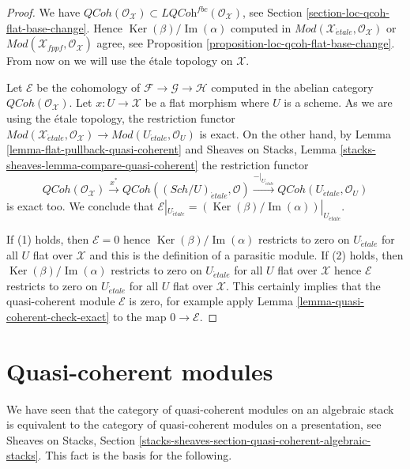 \documentclass{stacks-project}
\theoremstyle{plain}
\theoremstyle{definition}
\theoremstyle{remark}
\numberwithin{equation}{subsection}
\def\Sch{\mathit{Sch}}
\def\etale{{\acute{e}tale}}
\def\QCoh{\mathit{QCoh}}
\def\Ker{\mathop{\mathrm{Ker}}}
\def\Im{\mathop{\mathrm{Im}}}
\begin{document}
\begin{proof}
We have $\QCoh(\mathcal{O}_\mathcal{X}) \subset
\textit{LQCoh}^{fbc}(\mathcal{O}_\mathcal{X})$, see
Section \ref{section-loc-qcoh-flat-base-change}.
Hence $\Ker(\beta)/\Im(\alpha)$ computed in
$\textit{Mod}(\mathcal{X}_\etale, \mathcal{O}_\mathcal{X})$ or
$\textit{Mod}(\mathcal{X}_{fppf}, \mathcal{O}_\mathcal{X})$ agree, see
Proposition \ref{proposition-loc-qcoh-flat-base-change}.
From now on we will use the \'etale topology on $\mathcal{X}$.

\medskip\noindent
Let $\mathcal{E}$ be the cohomology of
$\mathcal{F} \to \mathcal{G} \to \mathcal{H}$
computed in the abelian category $\QCoh(\mathcal{O}_\mathcal{X})$.
Let $x : U \to \mathcal{X}$ be a flat morphism where $U$ is a scheme.
As we are using the \'etale topology, the restriction functor
$\textit{Mod}(\mathcal{X}_\etale, \mathcal{O}_\mathcal{X})
\to \textit{Mod}(U_\etale, \mathcal{O}_U)$ is exact.
On the other hand, by Lemma \ref{lemma-flat-pullback-quasi-coherent} and
Sheaves on Stacks, Lemma \ref{stacks-sheaves-lemma-compare-quasi-coherent}
the restriction functor
$$
\QCoh(\mathcal{O}_\mathcal{X}) \xrightarrow{x^*}
\QCoh((\Sch/U)_\etale, \mathcal{O}) \xrightarrow{{-}|_{U_\etale}}
\QCoh(U_\etale, \mathcal{O}_U)
$$
is exact too. We conclude that
$\mathcal{E}|_{U_\etale} = (\Ker(\beta)/\Im(\alpha))|_{U_\etale}$.

\medskip\noindent
If (1) holds, then $\mathcal{E} = 0$ hence $\Ker(\beta)/\Im(\alpha)$
restricts to zero on $U_\etale$ for all $U$ flat over $\mathcal{X}$ and this
is the definition of a parasitic module. If (2) holds, then
$\Ker(\beta)/\Im(\alpha)$ restricts to zero on $U_\etale$ for all $U$
flat over $\mathcal{X}$ hence $\mathcal{E}$ restricts to zero on
$U_\etale$ for all $U$ flat over $\mathcal{X}$. This certainly implies
that the quasi-coherent module $\mathcal{E}$ is zero, for example apply
Lemma \ref{lemma-quasi-coherent-check-exact}
to the map $0 \to \mathcal{E}$.
\end{proof}





\section{Quasi-coherent modules}
\label{section-quasi-coherent}

\noindent
We have seen that the category of quasi-coherent modules on an algebraic
stack is equivalent to the category of quasi-coherent modules on a
presentation, see
Sheaves on Stacks, Section
\ref{stacks-sheaves-section-quasi-coherent-algebraic-stacks}.
This fact is the basis for the following.
\end{document}

